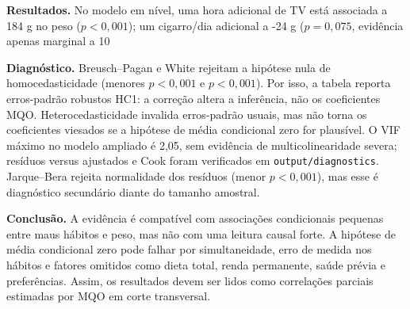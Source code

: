 \documentclass[10pt,a4paper]{article}
\begin{document}
\textbf{Resultados.} No modelo em nível, uma hora adicional de TV está associada a 184 g no peso ($p<0{,}001$); um cigarro/dia adicional a -24 g ($p=0{,}075$, evidência apenas marginal a 10%

\textbf{Diagnóstico.} Breusch--Pagan e White rejeitam a hipótese nula de homocedasticidade (menores $p<0{,}001$ e $p<0{,}001$). Por isso, a tabela reporta erros-padrão robustos HC1: a correção altera a inferência, não os coeficientes MQO. Heterocedasticidade invalida erros-padrão usuais, mas não torna os coeficientes viesados se a hipótese de média condicional zero for plausível. O VIF máximo no modelo ampliado é 2,05, sem evidência de multicolinearidade severa; resíduos versus ajustados e Cook foram verificados em \texttt{output/diagnostics}. Jarque--Bera rejeita normalidade dos resíduos (menor $p<0{,}001$), mas esse é diagnóstico secundário diante do tamanho amostral.

\textbf{Conclusão.} A evidência é compatível com associações condicionais pequenas entre maus hábitos e peso, mas não com uma leitura causal forte. A hipótese de média condicional zero pode falhar por simultaneidade, erro de medida nos hábitos e fatores omitidos como dieta total, renda permanente, saúde prévia e preferências. Assim, os resultados devem ser lidos como correlações parciais estimadas por MQO em corte transversal.
\end{document}
